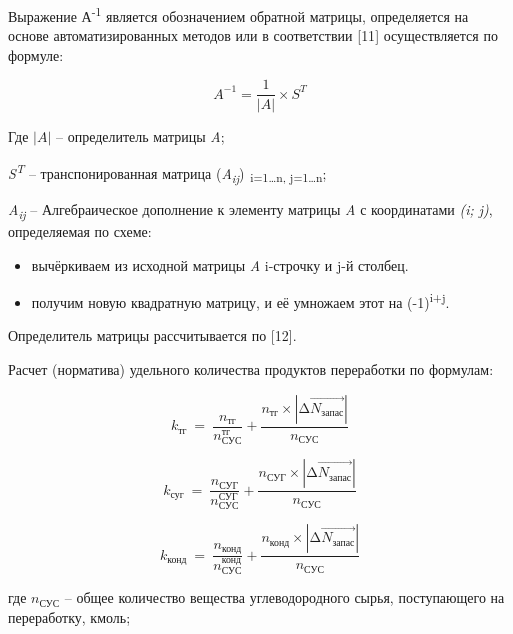 \begin{multicols}{2}
Выражение А\textsuperscript{-1} является обозначением обратной матрицы,
определяется на основе автоматизированных методов или в соответствии
{[}11{]} осуществляется по формуле:

\begin{equation}
A^{- 1} = \frac{1}{|A|} \times S^{T}
\end{equation}

Где \(|A|\) -- определитель матрицы \emph{A};

\emph{S\textsuperscript{T}} -- транспонированная матрица
(\textbar{}\emph{A\textsubscript{ij}}\textbar)\textsubscript{~i=1\ldots n,
j=1\ldots n};

\emph{A\textsubscript{ij}} -- Алгебраическое дополнение к элементу
матрицы \emph{A} с координатами \emph{(i; j)}, определяемая по схеме:

\begin{itemize}
\item
  вычёркиваем из исходной матрицы \emph{A} i-строчку и j-й столбец.
\item
  получим новую квадратную матрицу, и её умножаем этот на
  (-1)\textsuperscript{i+j}.
\end{itemize}

Определитель матрицы рассчитывается по {[}12{]}.

Расчет (норматива) удельного количества продуктов переработки по
формулам:

\begin{equation}
k_{\text{тг}}\  = \ \frac{n_{\text{тг}}}{n_{\text{СУС}}^{\text{тг}}} + \frac{n_{\text{тг}} \times \left| \mathrm{\Delta}\overrightarrow{Ν_{\text{запас}}} \right|}{n_{\text{СУС}}}
\end{equation}

\begin{equation}
k_{\text{суг}}\  = \ \frac{n_{\text{СУГ}}}{n_{\text{СУС}}^{\text{СУГ}}} + \frac{n_{\text{СУГ}} \times \left| \mathrm{\Delta}\overrightarrow{Ν_{\text{запас}}} \right|}{n_{\text{СУС}}}
\end{equation}

\begin{equation}
k_{\text{конд}}\  = \ \frac{n_{\text{конд}}}{n_{\text{СУС}}^{\text{конд}}} + \frac{n_{\text{конд}} \times \left| \mathrm{\Delta}\overrightarrow{Ν_{\text{запас}}} \right|}{n_{\text{СУС}}}
\end{equation}

где \(n_{\text{СУС}}\) -- общее количество вещества
углеводородного сырья, поступающего на переработку, кмоль;


\end{multicols}
